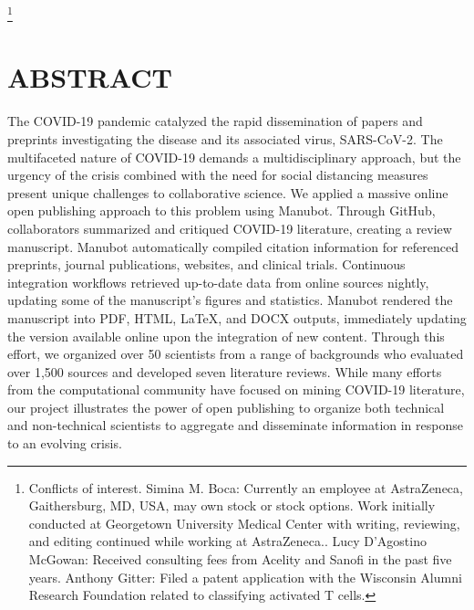 \documentclass[twocolumn]{ceurart}
\begin{document}


\maketitle

{\let\thefootnote\relax\footnote{Conflicts of interest. Simina M. Boca: Currently an employee at AstraZeneca, Gaithersburg, MD, USA, may own stock or stock options. Work initially conducted at Georgetown University Medical Center with writing, reviewing, and editing continued while working at AstraZeneca.. Lucy D'Agostino McGowan: Received consulting fees from Acelity and Sanofi in the past five years. Anthony Gitter: Filed a patent application with the Wisconsin Alumni Research Foundation related to classifying activated T cells.}}

\hypertarget{abstract}{%
\section{ABSTRACT}\label{abstract}}

The COVID-19 pandemic catalyzed the rapid dissemination of papers and preprints investigating the disease and its associated virus, SARS-CoV-2.
The multifaceted nature of COVID-19 demands a multidisciplinary approach, but the urgency of the crisis combined with the need for social distancing measures present unique challenges to collaborative science.
We applied a massive online open publishing approach to this problem using Manubot.
Through GitHub, collaborators summarized and critiqued COVID-19 literature, creating a review manuscript.
Manubot automatically compiled citation information for referenced preprints, journal publications, websites, and clinical trials.
Continuous integration workflows retrieved up-to-date data from online sources nightly, updating some of the manuscript's figures and statistics.
Manubot rendered the manuscript into PDF, HTML, LaTeX, and DOCX outputs, immediately updating the version available online upon the integration of new content.
Through this effort, we organized over 50 scientists from a range of backgrounds who evaluated over 1,500 sources and developed seven literature reviews.
While many efforts from the computational community have focused on mining COVID-19 literature, our project illustrates the power of open publishing to organize both technical and non-technical scientists to aggregate and disseminate information in response to an evolving crisis.
\end{document}

